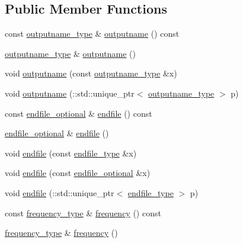 \subsection*{Public Member Functions}
\begin{DoxyCompactItemize}
\item 
const \hyperlink{classsetting__t_a176d76dc9ab1b149c679035ce0aa5448}{outputname\+\_\+type} \& \hyperlink{classsetting__t_a86ec4688deb07980eb7d44b98547173a}{outputname} () const 
\item 
\hyperlink{classsetting__t_a176d76dc9ab1b149c679035ce0aa5448}{outputname\+\_\+type} \& \hyperlink{classsetting__t_ac3f2edc8aad77c76689ca52bc8c2288c}{outputname} ()
\item 
void \hyperlink{classsetting__t_ab2920a7d22fe6b9db437304e9327fb33}{outputname} (const \hyperlink{classsetting__t_a176d76dc9ab1b149c679035ce0aa5448}{outputname\+\_\+type} \&x)
\item 
void \hyperlink{classsetting__t_abddaaf726abf34fa7f3bc987b651be36}{outputname} (\+::std\+::unique\+\_\+ptr$<$ \hyperlink{classsetting__t_a176d76dc9ab1b149c679035ce0aa5448}{outputname\+\_\+type} $>$ p)
\item 
const \hyperlink{classsetting__t_a38dbb691ee80d982dc24fd1b3e514f1e}{endfile\+\_\+optional} \& \hyperlink{classsetting__t_a24c34f4aa4daa11d5a052f1ca14b3fe8}{endfile} () const 
\item 
\hyperlink{classsetting__t_a38dbb691ee80d982dc24fd1b3e514f1e}{endfile\+\_\+optional} \& \hyperlink{classsetting__t_a3c03dd21228d2905b1419909ad313eab}{endfile} ()
\item 
void \hyperlink{classsetting__t_a585b4d86531bba11cef3b40521ad355b}{endfile} (const \hyperlink{classsetting__t_a395877994cdfcf2ea063a56aed90cf01}{endfile\+\_\+type} \&x)
\item 
void \hyperlink{classsetting__t_a12ad06b01a08cf6bd9d288d11e71e897}{endfile} (const \hyperlink{classsetting__t_a38dbb691ee80d982dc24fd1b3e514f1e}{endfile\+\_\+optional} \&x)
\item 
void \hyperlink{classsetting__t_acdd80110553c5b8fc147a904fc252d05}{endfile} (\+::std\+::unique\+\_\+ptr$<$ \hyperlink{classsetting__t_a395877994cdfcf2ea063a56aed90cf01}{endfile\+\_\+type} $>$ p)
\item 
const \hyperlink{classsetting__t_af0353930c8d9e0e19ee57943f2d130ee}{frequency\+\_\+type} \& \hyperlink{classsetting__t_aff581b7c1ab94d3f6981918b0898b7f5}{frequency} () const 
\item 
\hyperlink{classsetting__t_af0353930c8d9e0e19ee57943f2d130ee}{frequency\+\_\+type} \& \hyperlink{classsetting__t_a3c1fae9cc302428c1592d1eee2d536a1}{frequency} ()

\end{DoxyCompactItemize}
